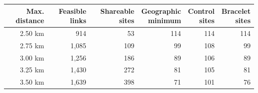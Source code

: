 \begin{tabular}{rrrrrr}
\toprule
Max. distance & Feasible links & Shareable sites & \makecell{Geographic\\minimum} & \makecell{Control\\sites} & \makecell{Bracelet\\sites} \\
\midrule
2.50 km & 914 & 53 & 114 & 114 & 114 \\
2.75 km & 1,085 & 109 & 99 & 108 & 99 \\
3.00 km & 1,256 & 186 & 89 & 106 & 89 \\
3.25 km & 1,430 & 272 & 81 & 105 & 81 \\
3.50 km & 1,639 & 398 & 71 & 101 & 76 \\
\bottomrule
\end{tabular}
